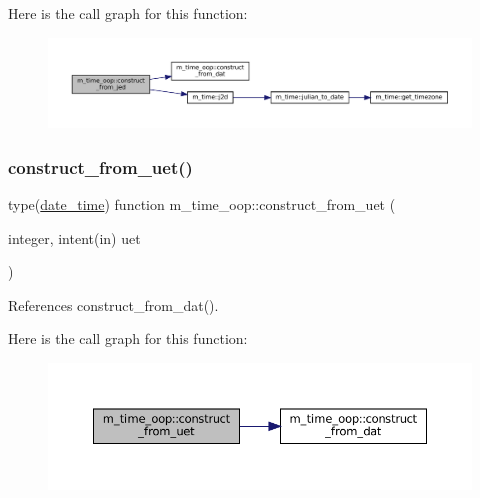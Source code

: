 Here is the call graph for this function\+:\nopagebreak
\begin{figure}[H]
\begin{center}
\leavevmode
\includegraphics[width=350pt]{namespacem__time__oop_ac7d9aa1885c2b8df613541be8a147064_cgraph}
\end{center}
\end{figure}
\mbox{\label{namespacem__time__oop_ae952d7599526f1b2632452d00363add3}} 
\subsubsection{\texorpdfstring{construct\+\_\+from\+\_\+uet()}{construct\_from\_uet()}}
{\footnotesize\ttfamily type(\mbox{\hyperlink{structm__time__oop_1_1date__time}{date\+\_\+time}}) function m\+\_\+time\+\_\+oop\+::construct\+\_\+from\+\_\+uet (\begin{DoxyParamCaption}\item[{integer, intent(in)}]{uet }\end{DoxyParamCaption})\hspace{0.3cm}{\ttfamily [private]}}



References construct\+\_\+from\+\_\+dat().

Here is the call graph for this function\+:\nopagebreak
\begin{figure}[H]
\begin{center}
\leavevmode
\includegraphics[width=350pt]{namespacem__time__oop_ae952d7599526f1b2632452d00363add3_cgraph}
\end{center}
\end{figure}
\mbox{\label{namespacem__time__oop_aecd1edc1f6ca447d5381c8092eba7924}} 
